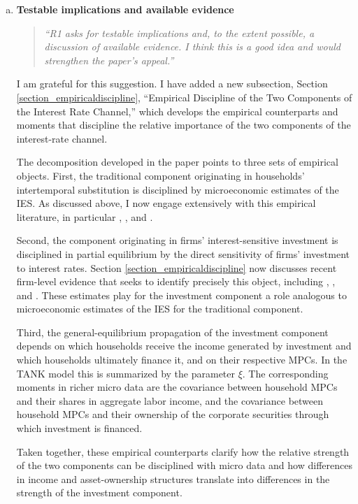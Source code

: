 \documentclass[11pt]{article}
\begin{document}
\begin{enumerate}[a)]

\item  \textbf{Testable implications and available evidence}

\begin{quote}
\itshape ``R1 asks for testable implications and, to the extent possible, a discussion of available evidence. I think this is a good idea and would strengthen the paper's appeal.''
\end{quote}

I am grateful for this suggestion. I have added a new subsection, Section \ref{section_empiricaldiscipline}, ``Empirical Discipline of the Two Components of the Interest Rate Channel,'' which develops the empirical counterparts and moments that discipline the relative importance of the two components of the interest-rate channel.

The decomposition developed in the paper points to three sets of empirical objects. First, the traditional component originating in households' intertemporal substitution is disciplined by microeconomic estimates of the IES. As discussed above, I now engage extensively with this empirical literature, in particular \cite{Hall1988}, \cite{Havranek2015}, and \cite{Bestetal2020}.

Second, the component originating in firms' interest-sensitive investment is disciplined in partial equilibrium by the direct sensitivity of firms' investment to interest rates. Section \ref{section_empiricaldiscipline} now discusses recent firm-level evidence that seeks to identify precisely this object, including \cite{Caoetal2023}, \cite{BestBornMenkhoff2025}, and \cite{SharpeSuarez2021}. These estimates play for the investment component a role analogous to microeconomic estimates of the IES for the traditional component.

Third, the general-equilibrium propagation of the investment component depends on which households receive the income generated by investment and which households ultimately finance it, and on their respective MPCs. In the TANK model this is summarized by the parameter $\xi$. The corresponding moments in richer micro data are the covariance between household MPCs and their shares in aggregate labor income, and the covariance between household MPCs and their ownership of the corporate securities through which investment is financed. 

Taken together, these empirical counterparts clarify how the relative strength of the two components can be disciplined with micro data and how differences in income and asset-ownership structures translate into differences in the strength of the investment component.


\end{enumerate}
\end{document}
